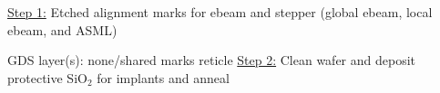 %
%
%


\newpage
\noindent \underline{Step 1:} Etched alignment marks for ebeam and stepper (global ebeam, local ebeam, and ASML)

\vspace{0.5em}
GDS layer(s): none/shared marks reticle
%
\newpage
\noindent \underline{Step 2:} Clean wafer and deposit protective SiO$_2$ for implants and anneal

